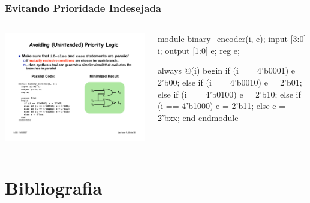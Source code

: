 \begin{frame}[fragile]
	\frametitle{Evitando Prioridade Indesejada}
	\begin{columns}
        \includegraphics[scale=.5]{figs/Encoder4to2Min}
    	\begin{verilogcode}
module binary_encoder(i, e); 
  input [3:0] i;
  output [1:0] e;
  reg e;
 
  always @(i)
  begin
    if (i == 4'b0001) 
      e = 2'b00; 
    else if (i == 4'b0010) 
      e = 2'b01; 
    else if (i == 4'b0100) 
      e = 2'b10; 
    else if (i == 4'b1000) 
      e = 2'b11; 
    else 
      e = 2'bxx;
  end
endmodule
        \end{verilogcode}
    \end{columns}
\end{frame}

\section<presentation>{Bibliografia}

